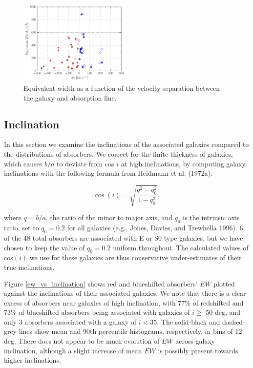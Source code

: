 \documentclass[twocolumn,tighten]{aastex6}
\providecommand{\DIFaddbegin}{} %
\providecommand{\DIFaddend}{} %
\providecommand{\DIFaddbeginFL}{} %
\providecommand{\DIFaddendFL}{} %
\providecommand{\DIFdelbeginFL}{} %
\providecommand{\DIFdelendFL}{} %
\begin{document}
\begin{figure}[ht!]
        \centering
        \includegraphics[width=0.49\textwidth]{fig10.pdf}
        \caption{\DIFdelbeginFL %
\DIFdelendFL \DIFaddbeginFL \small{Equivalent width as a function of the velocity separation between the galaxy and absorption line. }\DIFaddendFL }
        \label{W_veldif}
        \vspace{5pt}
\end{figure} 


\subsection{Inclination}
\DIFaddbegin \label{inclination}

\DIFaddend In this section we examine the inclinations of the associated galaxies compared to the distributions of absorbers. We correct for the finite thickness of galaxies, which causes $b/a$ to deviate from cos $i$ at high inclinations, by computing galaxy inclinations with the following formula from Heidmann et al. (1972a):

\begin{equation}
	\cos(i) = \sqrt{\frac{q^2 - q_0^2}{1 - q_0^2}},
	\label{incEq}
\end{equation}

\noindent where $q = b/a$, the ratio of the minor to major axis, and $q_0$ is the intrinsic axis ratio, set to $q_0 = 0.2$ for all galaxies (e.g., Jones, Davies, and Trewhella 1996). 6 of the 48 total absorbers are associated with E or S0 type galaxies, but we have chosen to keep the value of $q_0 = 0.2$ uniform throughout. The calculated values of cos$(i)$ we use for these galaxies are thus conservative under-estimates of their true inclinations.

Figure \ref{ew_vs_inclination} shows red and blueshifted absorbers' $EW$ plotted against the inclinations of their associated galaxies. We note that there is a clear excess of absorbers near galaxies of high inclination, with $77\%$ of redshifted and $73\%$ of blueshifted absorbers being associated with galaxies of $i \geq$ 50 deg, and only 3 absorbers associated with a galaxy of $i<35$. The solid-black and dashed-grey lines show mean and 90th percentile histograms, respectively, in bins of 12 deg. There does not appear to be much evolution of $EW$ across galaxy inclination, although a slight increase of mean $EW$ is possibly present towards higher inclinations.
\end{document}
